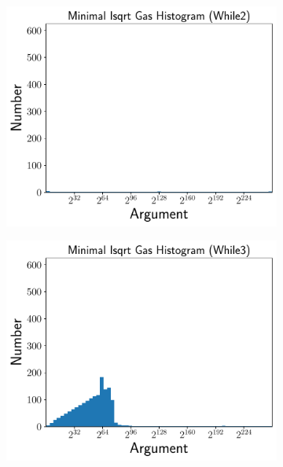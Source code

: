 \begin{figure}[p]
    \begin{subfigure}[t]{0.45\textwidth}
    \includegraphics[width=\textwidth]{plots/minimal_hist_While2_ed.pdf}
    \end{subfigure}
    \begin{subfigure}[t]{0.45\textwidth}
    \includegraphics[width=\textwidth]{plots/minimal_hist_While3_ed.pdf}
    \end{subfigure}


\end{figure}
